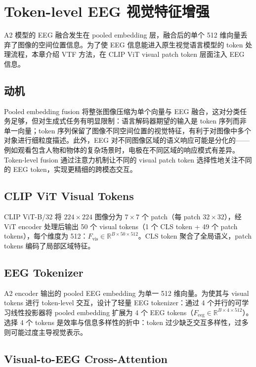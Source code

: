 \section{Token-level EEG 视觉特征增强}

A2 模型的 EEG 融合发生在 pooled embedding 层，融合后的单个 512 维向量丢弃了图像的空间位置信息。为了使 EEG 信息能进入原生视觉语言模型的 token 处理流程，本章介绍 VTF 方法，在 CLIP ViT visual patch token 层面注入 EEG 信息。

\subsection{动机}

Pooled embedding fusion 将整张图像压缩为单个向量与 EEG 融合，这对分类任务足够，但对生成式任务有明显限制：语言解码器期望的输入是 token 序列而非单一向量；token 序列保留了图像不同空间位置的视觉特征，有利于对图像中多个对象进行细粒度描述。此外，EEG 对不同图像区域的语义响应可能是分化的——例如观看包含人物和物体的复杂场景时，电极在不同区域的响应模式有差异。Token-level fusion 通过注意力机制让不同的 visual patch token 选择性地关注不同的 EEG token，实现更精细的跨模态交互。

\subsection{CLIP ViT Visual Tokens}

CLIP ViT-B/32 将 $224\times224$ 图像分为 $7\times7$ 个 patch（每 patch $32\times32$），经 ViT encoder 处理后输出 50 个 visual tokens（1 个 CLS token + 49 个 patch tokens），每个维度为 512：$F_{\mathrm{vis}} \in \mathbb{R}^{B\times50\times512}$。CLS token 聚合了全局语义，patch tokens 编码了局部区域特征。

\subsection{EEG Tokenizer}

A2 encoder 输出的 pooled EEG embedding 为单一 512 维向量。为使其与 visual tokens 进行 token-level 交互，设计了轻量 EEG tokenizer：通过 4 个并行的可学习线性投影器将 pooled embedding 扩展为 4 个 EEG tokens（$F_{\mathrm{eeg}} \in \mathbb{R}^{B\times4\times512}$）。选择 4 个 tokens 是效率与信息多样性的折中：token 过少缺乏交互多样性，过多则可能过度主导视觉表示。

\subsection{Visual-to-EEG Cross-Attention}

